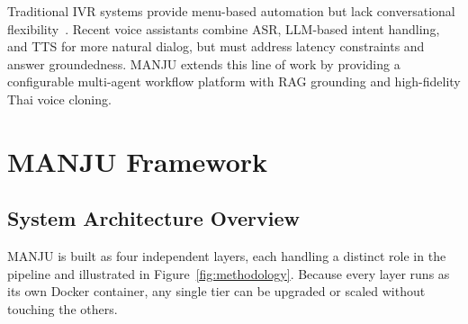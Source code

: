 \documentclass[10pt, a4paper, twocolumn]{article}
\begin{document}
Traditional IVR systems provide menu-based automation but lack conversational flexibility~\cite{gans2003callcenters}.
Recent voice assistants combine ASR, LLM-based intent handling, and TTS for more natural dialog, but must address latency constraints and answer groundedness.
MANJU extends this line of work by providing a configurable multi-agent workflow platform with RAG grounding and high-fidelity Thai voice cloning.

\section{MANJU Framework}
\label{sec:methodology}

\subsection{System Architecture Overview}

MANJU is built as four independent layers, each handling a distinct role
in the pipeline and illustrated in Figure~\ref{fig:methodology}.
Because every layer runs as its own Docker container, any single tier can
be upgraded or scaled without touching the others.
\end{document}
